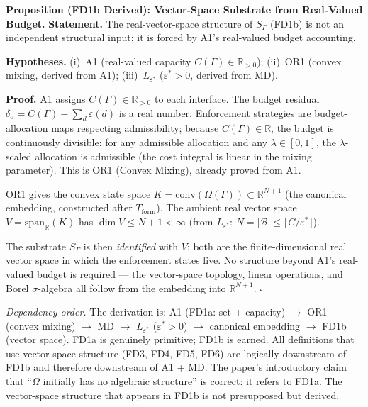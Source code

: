 \documentclass[11pt]{article}
\theoremstyle{remark}
\begin{document}
\medskip\noindent\textbf{Proposition (FD1b Derived): Vector-Space Substrate from Real-Valued Budget.}
\label{prop:FD1_derived}
\textbf{Statement.}  The real-vector-space structure of $S_\Gamma$ (FD1b) is not an independent structural input; it is forced by A1's real-valued budget accounting.

\smallskip\noindent\textbf{Hypotheses.}  (i)~A1 (real-valued capacity $C(\Gamma) \in \mathbb{R}_{>0}$); (ii)~OR1 (convex mixing, derived from A1); (iii)~$L_{\varepsilon^*}$ ($\varepsilon^* > 0$, derived from MD).

\smallskip\noindent\textbf{Proof.}
A1 assigns $C(\Gamma) \in \mathbb{R}_{>0}$ to each interface.  The budget residual $\delta_\sigma = C(\Gamma) - \sum_d \varepsilon(d)$ is a real number.  Enforcement strategies are budget-allocation maps respecting admissibility; because $C(\Gamma) \in \mathbb{R}$, the budget is continuously divisible: for any admissible allocation and any $\lambda \in [0,1]$, the $\lambda$-scaled allocation is admissible (the cost integral is linear in the mixing parameter).  This is OR1 (Convex Mixing), already proved from A1.

OR1 gives the convex state space $K = \mathrm{conv}(\Omega(\Gamma)) \subset \mathbb{R}^{N+1}$ (the canonical embedding, constructed after $T_{\mathrm{form}}$).  The ambient real vector space $V = \mathrm{span}_\mathbb{R}(K)$ has $\dim V \le N + 1 < \infty$ (from $L_{\varepsilon^*}$: $N = |\mathcal{B}| \le \lfloor C/\varepsilon^* \rfloor$).

The substrate $S_\Gamma$ is then \emph{identified} with $V$: both are the finite-dimensional real vector space in which the enforcement states live.  No structure beyond A1's real-valued budget is required --- the vector-space topology, linear operations, and Borel $\sigma$-algebra all follow from the embedding into $\mathbb{R}^{N+1}$.  \hfill$\square$

\smallskip\noindent\textit{Dependency order.}  The derivation is: A1 (FD1a: set + capacity) $\to$ OR1 (convex mixing) $\to$ MD $\to$ $L_{\varepsilon^*}$ ($\varepsilon^* > 0$) $\to$ canonical embedding $\to$ FD1b (vector space).  FD1a is genuinely primitive; FD1b is earned.  All definitions that use vector-space structure (FD3, FD4, FD5, FD6) are logically downstream of FD1b and therefore downstream of A1 + MD.  The paper's introductory claim that ``$\Omega$ initially has no algebraic structure'' is correct: it refers to FD1a.  The vector-space structure that appears in FD1b is not presupposed but derived.
\end{document}

